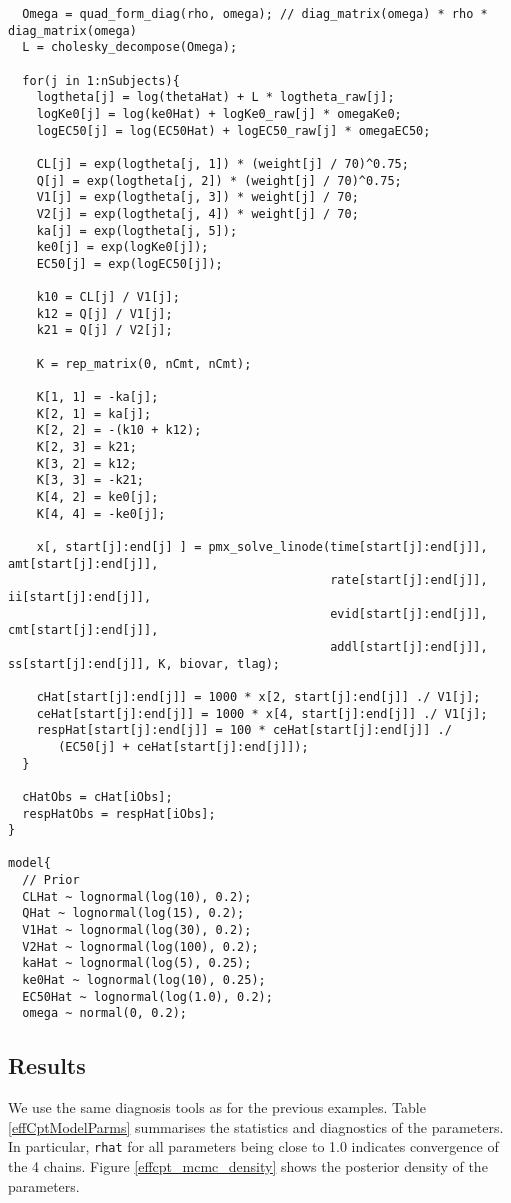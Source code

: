 \documentclass[12pt, reqno, oneside]{amsbook}
\numberwithin{equation}{chapter}
\numberwithin{figure}{chapter}
\numberwithin{table}{chapter}
\theoremstyle{remark}
\begin{document}
\begin{verbatim}
  Omega = quad_form_diag(rho, omega); // diag_matrix(omega) * rho * diag_matrix(omega)
  L = cholesky_decompose(Omega);

  for(j in 1:nSubjects){
    logtheta[j] = log(thetaHat) + L * logtheta_raw[j];
    logKe0[j] = log(ke0Hat) + logKe0_raw[j] * omegaKe0;
    logEC50[j] = log(EC50Hat) + logEC50_raw[j] * omegaEC50;

    CL[j] = exp(logtheta[j, 1]) * (weight[j] / 70)^0.75;
    Q[j] = exp(logtheta[j, 2]) * (weight[j] / 70)^0.75;
    V1[j] = exp(logtheta[j, 3]) * weight[j] / 70;
    V2[j] = exp(logtheta[j, 4]) * weight[j] / 70;
    ka[j] = exp(logtheta[j, 5]);
    ke0[j] = exp(logKe0[j]);
    EC50[j] = exp(logEC50[j]);

    k10 = CL[j] / V1[j];
    k12 = Q[j] / V1[j];
    k21 = Q[j] / V2[j];

    K = rep_matrix(0, nCmt, nCmt);

    K[1, 1] = -ka[j];
    K[2, 1] = ka[j];
    K[2, 2] = -(k10 + k12);
    K[2, 3] = k21;
    K[3, 2] = k12;
    K[3, 3] = -k21;
    K[4, 2] = ke0[j];
    K[4, 4] = -ke0[j];

    x[, start[j]:end[j] ] = pmx_solve_linode(time[start[j]:end[j]], amt[start[j]:end[j]],
                                             rate[start[j]:end[j]], ii[start[j]:end[j]],
                                             evid[start[j]:end[j]], cmt[start[j]:end[j]],
                                             addl[start[j]:end[j]], ss[start[j]:end[j]], K, biovar, tlag);

    cHat[start[j]:end[j]] = 1000 * x[2, start[j]:end[j]] ./ V1[j];
    ceHat[start[j]:end[j]] = 1000 * x[4, start[j]:end[j]] ./ V1[j];
    respHat[start[j]:end[j]] = 100 * ceHat[start[j]:end[j]] ./
       (EC50[j] + ceHat[start[j]:end[j]]);
  }

  cHatObs = cHat[iObs];
  respHatObs = respHat[iObs];
}

model{
  // Prior
  CLHat ~ lognormal(log(10), 0.2);
  QHat ~ lognormal(log(15), 0.2);
  V1Hat ~ lognormal(log(30), 0.2);
  V2Hat ~ lognormal(log(100), 0.2);
  kaHat ~ lognormal(log(5), 0.25);
  ke0Hat ~ lognormal(log(10), 0.25);
  EC50Hat ~ lognormal(log(1.0), 0.2);
  omega ~ normal(0, 0.2);
\end{verbatim}

\subsection{Results}
\label{sec:org73a9298}
We use the same diagnosis tools as for the
previous examples. Table \ref{effCptModelParms} summarises the
statistics and diagnostics of the parameters. In particular, \texttt{rhat}
for all parameters being close to 1.0 indicates convergence of the 4
chains. Figure \ref{effcpt_mcmc_density} shows the posterior density of
the parameters.
\end{document}
